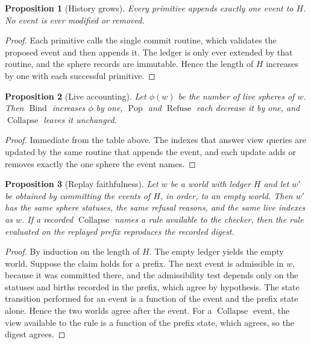 \documentclass[11pt,oneside]{report}
\newcommand{\Pop}{\operatorname{Pop}}
\newcommand{\Refuse}{\operatorname{Refuse}}
\newcommand{\Bind}{\operatorname{Bind}}
\newcommand{\Collapse}{\operatorname{Collapse}}
\theoremstyle{plain}
\newtheorem{proposition}{Proposition}[chapter]
\theoremstyle{definition}
\theoremstyle{remark}
\begin{document}
\begin{proposition}[History grows]\label{prop:grow}
Every primitive appends exactly one event to $H$. No event is ever modified or removed.
\end{proposition}

\begin{proof}
Each primitive calls the single commit routine, which validates the proposed event and then appends it. The ledger is only ever extended by that routine, and the sphere records are immutable. Hence the length of $H$ increases by one with each successful primitive.
\end{proof}

\begin{proposition}[Live accounting]\label{prop:live}
Let $\phi(w)$ be the number of live spheres of $w$. Then $\Bind$ increases $\phi$ by one, $\Pop$ and $\Refuse$ each decrease it by one, and $\Collapse$ leaves it unchanged.
\end{proposition}

\begin{proof}
Immediate from the table above. The indexes that answer view queries are updated by the same routine that appends the event, and each update adds or removes exactly the one sphere the event names.
\end{proof}

\begin{proposition}[Replay faithfulness]\label{prop:replay}
Let $w$ be a world with ledger $H$ and let $w'$ be obtained by committing the events of $H$, in order, to an empty world. Then $w'$ has the same sphere statuses, the same refusal reasons, and the same live indexes as $w$. If a recorded $\Collapse$ names a rule available to the checker, then the rule evaluated on the replayed prefix reproduces the recorded digest.
\end{proposition}

\begin{proof}
By induction on the length of $H$. The empty ledger yields the empty world. Suppose the claim holds for a prefix. The next event is admissible in $w$, because it was committed there, and the admissibility test depends only on the statuses and births recorded in the prefix, which agree by hypothesis. The state transition performed for an event is a function of the event and the prefix state alone. Hence the two worlds agree after the event. For a $\Collapse$ event, the view available to the rule is a function of the prefix state, which agrees, so the digest agrees.
\end{proof}
\end{document}

